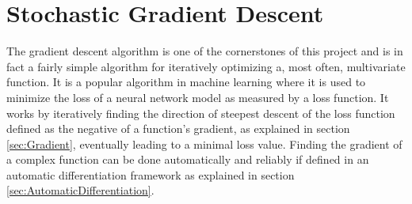 




\section{Stochastic Gradient Descent}\label{sec:StochasticGradientDescent}

The gradient descent algorithm is one of the cornerstones of this project and is in fact a fairly simple algorithm for iteratively optimizing a, most often, multivariate function. It is a popular algorithm in machine learning where it is used to minimize the loss of a neural network model as measured by a loss function. It works by iteratively finding the direction of steepest descent of the loss function defined as the negative of a function's gradient, as explained in section \ref{sec:Gradient}, eventually leading to a minimal loss value. Finding the gradient of a complex function can be done automatically and reliably if defined in an automatic differentiation framework as explained in section \ref{sec:AutomaticDifferentiation}. 

